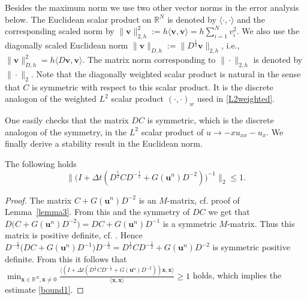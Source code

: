 \documentclass{siamltex}
\newcommand{\R}{\mathbb{R}}
\newcommand{\bu}{\mathbf u}
\newcommand{\bv}{\mathbf v}
\newcommand{\bx}{\mathbf x}
\begin{document}
{Besides the maximum norm we use two other vector norms in the error analysis below. The Euclidean scalar product on $\R^N$ is denoted by $\langle \cdot,\cdot\rangle$ and the corresponding scaled norm by $\|\bv\|_{2,h}^2:=h \langle \bv,\bv\rangle = h\sum_{i=1}^N v_i^2$. We also use the diagonally scaled Euclidean norm $\|\bv\|_{D,h}:=\|D^\frac12 \bv\|_{2,h}$, i.e., $\|\bv\|_{D,h}^2= h \langle D\bv, \bv\rangle$. The matrix norm corresponding  to $\|\cdot\|_{2,h}$ is denoted by $\|\cdot\|_2$. Note that the diagonally weighted scalar product is natural in  the sense that $C$ is symmetric with respect to this scalar product. It is the discrete analogon of the weighted $L^2$ scalar product $(\cdot,\cdot)_w$ used in \eqref{L2weighted}.

One easily checks that the matrix $DC$ is symmetric, which is the discrete analogon of the symmetry, in the $L^2$ scalar product of $u \to -xu_{xx}-u_x$. We finally derive a stability result in the Euclidean norm. 
 \begin{lemma} \label{lemma5}
  The following holds
  \begin{equation} \label{bound1}
    \|\big(I+ \Delta t(D^\frac12 C D^{- \frac12} +G(\bu^n)D^{-2})\big)^{-1}\|_2 \leq 1.
  \end{equation}
 \end{lemma}
 \begin{proof}
The matrix  $C+G(\bu^n)D^{-2}$ is an $M$-matrix, cf. proof of Lemma~\ref{lemma3}. From this and the symmetry of $DC$ we get that $D\big(C+G(\bu^n)D^{-2})=DC+G(\bu^n)D^{-1}$ is a symmetric $M$-matrix. Thus this matrix is positive definite, cf. 
\cite[Theorem 5.1]{Fiedler}. 
Hence $D^{-\frac12}\big(DC+G(\bu^n)D^{-1}\big)D^{-\frac12}= D^\frac12 C D^{- \frac12} +G(\bu^n)D^{-2}$ is symmetric positive definite.  From this it follows that $\min_{\bx \in \R^N, \bx \neq 0}\frac{\langle (I+ \Delta t(D^\frac12 C D^{- \frac12} +G(\bu^n)D^{-2})) \bx,\bx\rangle}{\langle \bx, \bx \rangle} \geq 1$  holds, which implies the estimate \eqref{bound1}. 
\end{proof}




}
\end{document}
